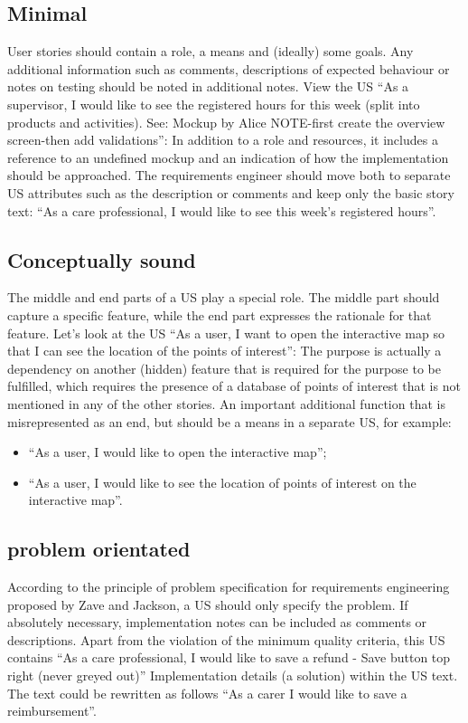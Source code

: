 \subsection*{\normalsize{Minimal}}
User stories should contain a role, a means and (ideally) some goals. Any additional information such as comments, descriptions of expected behaviour or notes on testing should be noted in additional notes. View the US \enquote{As a supervisor, I would like to see the registered hours for this week (split into products and activities). See: Mockup by Alice NOTE-first create the overview screen-then add validations}: In addition to a role and resources, it includes a reference to an undefined mockup and an indication of how the implementation should be approached. The requirements engineer should move both to separate US attributes such as the description or comments and keep only the basic story text: \enquote{As a care professional, I would like to see this week's registered hours}.
\subsection*{\normalsize{Conceptually sound}}
The middle and end parts of a US play a special role. The middle part should capture a specific feature, while the end part expresses the rationale for that feature. Let's look at the US \enquote{As a user, I want to open the interactive map so that I can see the location of the points of interest}: The purpose is actually a dependency on another (hidden) feature that is required for the purpose to be fulfilled, which requires the presence of a database of points of interest that is not mentioned in any of the other stories. An important additional function that is misrepresented as an end, but should be a means in a separate US, for example:
\begin{itemize}
\item \enquote{As a user, I would like to open the interactive map};
\item \enquote{As a user, I would like to see the location of points of interest on the interactive map}.
\end{itemize}
\subsection*{\normalsize{problem orientated}}
According to the principle of problem specification for requirements engineering proposed by Zave and Jackson, a US should only specify the problem. If absolutely necessary, implementation notes can be included as comments or descriptions. Apart from the violation of the minimum quality criteria, this US contains \enquote{As a care professional, I would like to save a refund - Save button top right (never greyed out)} Implementation details (a solution) within the US text. The text could be rewritten as follows \enquote{As a carer I would like to save a reimbursement}.
